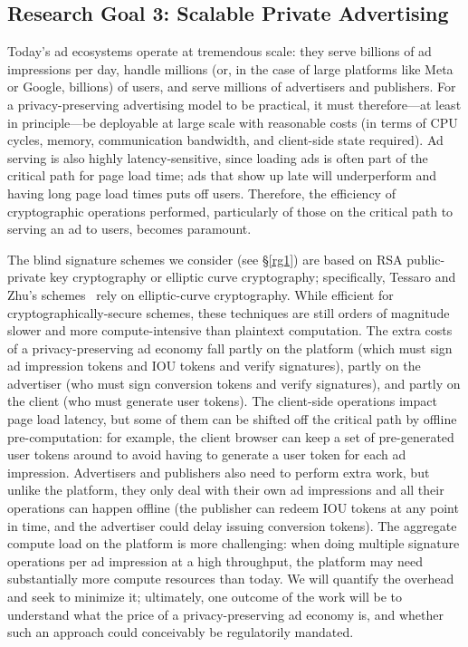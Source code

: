 \subsection{Research Goal 3: Scalable Private Advertising}
\label{s:rg3}

%
Today's ad ecosystems operate at tremendous scale: they serve billions of ad impressions per day, handle millions (or, in the case of large platforms like Meta or Google, billions) of users, and serve millions of advertisers and publishers.
%
For a privacy-preserving advertising model to be practical, it must therefore---at least in principle---be deployable at large scale with reasonable costs (in terms of CPU cycles, memory, communication bandwidth, and client-side state required).
%
Ad serving is also highly latency-sensitive, since loading ads is often part of the critical path for page load time; ads that show up late will underperform and having long page load times puts off users.
%
Therefore, the efficiency of cryptographic operations performed, particularly of those on the critical path to serving an ad to users, becomes paramount.
%

%
The blind signature schemes we consider (see \S\ref{rg1}) are based on RSA public-private key cryptography or elliptic curve cryptography; specifically, Tessaro and Zhu's schemes~\cite{EC:TesZhu22} rely on elliptic-curve cryptography.
%
While efficient for cryptographically-secure schemes, these techniques are still orders of magnitude slower and more compute-intensive than plaintext computation.
%
The extra costs of a privacy-preserving ad economy fall partly on the platform (which must sign ad impression tokens and IOU tokens and verify signatures), partly on the advertiser (who must sign conversion tokens and verify signatures), and partly on the client (who must generate user tokens).
%
The client-side operations impact page load latency, but some of them can be shifted off the critical path by offline pre-computation: for example, the client browser can keep a set of pre-generated user tokens around to avoid having to generate a user token for each ad impression.
%
Advertisers and publishers also need to perform extra work, but unlike the platform, they only deal with their own ad impressions and all their operations can happen offline (\eg the publisher can redeem IOU tokens at any point in time, and the advertiser could delay issuing conversion tokens).
%
The aggregate compute load on the platform is more challenging: when doing multiple signature operations per ad impression at a high throughput, the platform may need substantially more compute resources than today.
%
We will quantify the overhead and seek to minimize it; ultimately, one outcome of the work will be to understand what the price of a privacy-preserving ad economy is, and whether such an approach could conceivably be regulatorily mandated.
%
